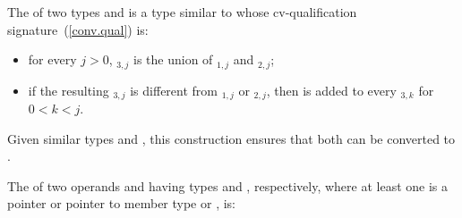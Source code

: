 \pnum
The  of two types  and 
is a type 
similar to  whose cv-qualification signature~(\ref{conv.qual}) is:
\begin{itemize}
\item
for every $j > 0$, \cv$_{3,j}$ is the union of
\cv$_{1,j}$ and \cv$_{2,j}$;

\item
if the resulting \cv$_{3,j}$ is different from
\cv$_{1,j}$ or \cv$_{2,j}$, then
 is added to every \cv$_{3,k}$ for $0 < k < j$.
\end{itemize}

\begin{note} Given similar types  and , this
construction ensures that
both can be converted to . \end{note}
%
The  of
two operands  and
 having types  and , respectively, where at least one is a
pointer or pointer to member type or
, is:

